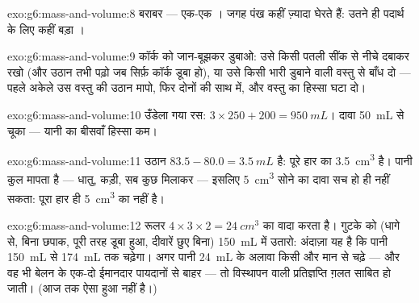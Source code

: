 \begin{solution}{exo:g6:mass-and-volume:8}
 बराबर --- एक-एक । जगह पंख कहीं ज़्यादा घेरते हैं:
उतने ही पदार्थ के लिए कहीं बड़ा ।
\end{solution}

\begin{solution}{exo:g6:mass-and-volume:9}
कॉर्क को जान-बूझकर डुबाओ: उसे किसी पतली सींक से नीचे दबाकर रखो (और
उठान तभी पढ़ो जब सिर्फ़ कॉर्क डूबा हो), या उसे किसी भारी डुबाने वाली
वस्तु से बाँध दो --- पहले अकेले उस वस्तु की उठान मापो, फिर दोनों की
साथ में, और वस्तु का हिस्सा घटा दो।
\end{solution}

\begin{solution}{exo:g6:mass-and-volume:10}
उँडेला गया रस: $3 \times 250 + 200 = \qty{950}{mL}$। दावा
\qty{50}{mL} से चूका --- यानी  का बीसवाँ हिस्सा कम।
\end{solution}

\begin{solution}{exo:g6:mass-and-volume:11}
उठान $83.5 - 80.0 = \qty{3.5}{mL}$ है: पूरे हार का 
\qty{3.5}{cm^3} है। पानी कुल  मापता है --- धातु, कड़ी, सब कुछ
मिलाकर --- इसलिए \qty{5}{cm^3} सोने का दावा सच हो ही नहीं सकता: पूरा
हार ही \qty{5}{cm^3} का नहीं है।
\end{solution}

\begin{solution}{exo:g6:mass-and-volume:12}
रूलर $4 \times 3 \times 2 = \qty{24}{cm^3}$ का वादा करता है। गुटके
को (धागे से, बिना छपाक, पूरी तरह डूबा हुआ, दीवारें छुए बिना)
\qty{150}{mL} में उतारो: अंदाज़ा यह है कि पानी \qty{150}{mL} से
\qty{174}{mL} तक चढ़ेगा। अगर पानी \qty{24}{mL} के अलावा किसी और मान
से चढ़े --- और वह भी बेलन के एक-दो ईमानदार पायदानों से बाहर --- तो
विस्थापन वाली प्रतिज्ञप्ति ग़लत साबित हो जाती। (आज तक ऐसा हुआ नहीं
है।)
\end{solution}

